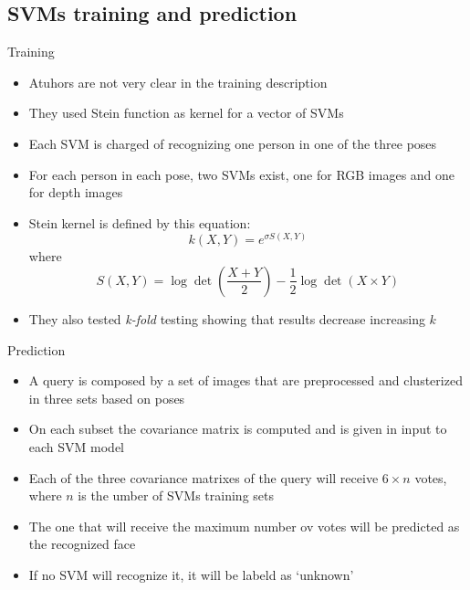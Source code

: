 \documentclass{beamer}
\begin{document}
\subsection{SVMs training and prediction}
\begin{frame}{Training}
	\begin{itemize}
		\item Atuhors are not very clear in the training description
		\item They used Stein function as kernel for a vector of SVMs
		\item Each SVM is charged of recognizing one person in one of
			the three poses
		\item For each person in each pose, two SVMs exist, one for RGB
			images and one for depth images
		\item Stein kernel is defined by this equation:
			$$
			k(X, Y) = e^{\sigma S(X,Y)}
			$$
			where
			$$
			S(X, Y) = \log\det\left(\frac{X +
			Y}{2}\right)-\frac{1}{2} \log \det(X\times Y)
			$$
		\item They also tested \textit{k-fold} testing showing that
			results decrease increasing $k$

	\end{itemize}
\end{frame}

\begin{frame}{Prediction}
	\begin{itemize}
		\item A query is composed by a set of images that are
			preprocessed and clusterized in three sets based on
			poses
		\item On each subset the covariance matrix is computed and is
			given in input to each SVM model
		\item Each of the three covariance matrixes of the query will
			receive $6 \times n$ votes, where $n$ is the umber of
			SVMs training sets
		\item The one that will receive the maximum number ov votes
			will be predicted as the recognized face
		\item If no SVM will recognize it, it will be labeld as
			`unknown'
	\end{itemize}
\end{frame}
\end{document}
